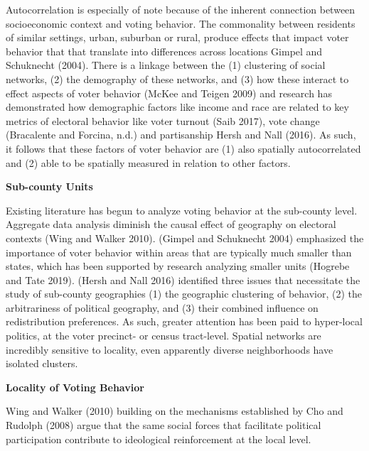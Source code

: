 \documentclass[
]{article}
\begin{document}
Autocorrelation is especially of note because of the inherent connection
between socioeconomic context and voting behavior. The commonality
between residents of similar settings, urban, suburban or rural, produce
effects that impact voter behavior that that translate into differences
across locations Gimpel and Schuknecht (2004). There is a linkage
between the (1) clustering of social networks, (2) the demography of
these networks, and (3) how these interact to effect aspects of voter
behavior (McKee and Teigen 2009) and research has demonstrated how
demographic factors like income and race are related to key metrics of
electoral behavior like voter turnout (Saib 2017), vote change
(Bracalente and Forcina, n.d.) and partisanship Hersh and Nall (2016).
As such, it follows that these factors of voter behavior are (1) also
spatially autocorrelated and (2) able to be spatially measured in
relation to other factors.

\textbf{Sub-county Units}

Existing literature has begun to analyze voting behavior at the
sub-county level. Aggregate data analysis diminish the causal effect of
geography on electoral contexts (Wing and Walker 2010). (Gimpel and
Schuknecht 2004) emphasized the importance of voter behavior within
areas that are typically much smaller than states, which has been
supported by research analyzing smaller units (Hogrebe and Tate 2019).
(Hersh and Nall 2016) identified three issues that necessitate the study
of sub-county geographies (1) the geographic clustering of behavior, (2)
the arbitrariness of political geography, and (3) their combined
influence on redistribution preferences. As such, greater attention has
been paid to hyper-local politics, at the voter precinct- or census
tract-level. Spatial networks are incredibly sensitive to locality, even
apparently diverse neighborhoods have isolated clusters.

\textbf{Locality of Voting Behavior}

Wing and Walker (2010) building on the mechanisms established by Cho and
Rudolph (2008) argue that the same social forces that facilitate
political participation contribute to ideological reinforcement at the
local level.
\end{document}
